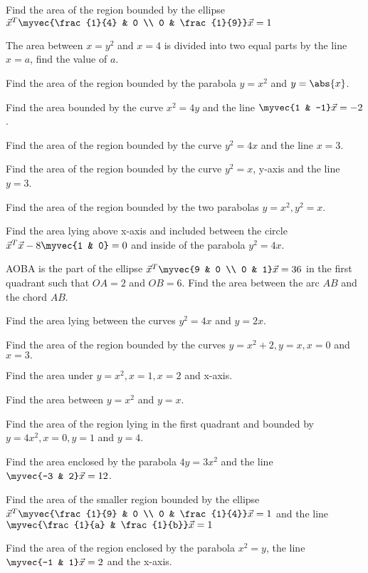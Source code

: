 \item  Find the area of the region bounded by the ellipse 
$
\vec{x}^T\myvec{\frac{1}{4} & 0 \\ 0 & \frac{1}{9}}\vec{x} = 1
$
\item The area between $x=y^2$ and $x=4$ is divided into two equal parts by the line $x=a$, find the value of $a$.
\item  Find the area of the region bounded by the parabola $y = x^2$ and $y = \abs{x}$.
\item  Find the area bounded by the curve $x^2 = 4y$ and the line $\myvec{1 & -1}\vec{x} = -2$.
\item  Find the area of the region bounded by the curve $y^2 = 4x$ and the line $x = 3$.
%
\item Find the area of the region bounded by the curve $y^2 = x$, y-axis and the line $y = 3$.
%
\item Find the area of the region bounded by the two parabolas $y = x^2, y^2=x$.
\item Find the area lying above x-axis and included between the circle $\vec{x}^T\vec{x} -8\myvec{1 & 0}= 0$  and inside of the parabola $y^2 = 4x$.
%
\item AOBA is the part of the ellipse 
$
\vec{x}^T\myvec{9 & 0 \\ 0 & 1}\vec{x} = 36
$
in the first quadrant such that $OA = 2$ and $OB = 6$. Find the area between the arc $AB$ and the chord $AB$.
\item Find the area lying between the curves $y^2 = 4x$ and $y = 2x$.
\item  Find the area of the region bounded by the curves $y = x^2+2, y = x, x = 0$ and $ x = 3.$
%
\item Find the area under $y = x^2, x = 1, x = 2$ and x-axis.
\item Find the area between  $y = x^2$ and $y = x$.
\item Find the area of the region lying in the first quadrant and bounded by $y = 4x^2, x = 0, y = 1$ and $y = 4$.
\item Find the area enclosed by the parabola $4y = 3x^2$ and the line $\myvec{-3 & 2}\vec{x} = 12$.
%
\item Find the area of the smaller region bounded by the ellipse
$
\vec{x}^T\myvec{\frac{1}{9} & 0 \\ 0 & \frac{1}{4}}\vec{x} = 1
$
and the line 
$
\myvec{\frac{1}{a} & \frac{1}{b}}\vec{x} = 1
$
\item Find the area of the region enclosed by the parabola $x^2=y$, the line $\myvec{-1 & 1}\vec{x} = 2$ and the x-axis.
